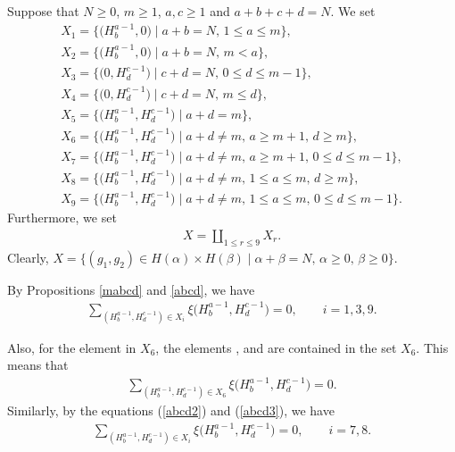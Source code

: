 \documentclass[pdftex]{sigma}
\numberwithin{equation}{section}
\begin{document}
Suppose that $N\geq0$, $m\geq1$, $a,c\geq1$ and $a+b+c+d=N$. We set
\begin{gather*}
X_1=\bigl\{\bigl(H^{a-1}_{b},0\bigr)\mid a+b=N,\, 1\leq a \leq m\bigr\},%
\\
X_2=\bigl\{\bigl(H^{a-1}_{b},0\bigr)\mid a+b=N,\, m<a\bigr\},
\\
X_3=\bigl\{\bigl(0,H^{c-1}_{d}\bigr)\mid c+d=N,\, 0\leq d \leq m-1\bigr\},%
\\
X_4=\bigl\{\bigl(0,H^{c-1}_{d}\bigr)\mid c+d=N,\, m\leq d\bigr\},
\\
X_5=\bigl\{\bigl(H^{a-1}_{b},H^{c-1}_{d}\bigr)\mid a+d=m\bigr\},%
\\
X_6=\bigl\{\bigl(H^{a-1}_{b},H^{c-1}_{d}\bigr)\mid a+d\ne m,\,a\geq m+1,\, d\geq m\bigr\},%
\\
X_7=\bigl\{\bigl(H^{a-1}_{b},H^{c-1}_{d}\bigr)\mid a+d\ne m,\,a\geq m+1,\,0\leq d \leq m-1\bigr\},%
\\
X_8=\bigl\{\bigl(H^{a-1}_{b},H^{c-1}_{d}\bigr)\mid a+d\ne m,\,1\leq a\leq m,\,d\geq m\bigr\},%
\\
X_9=\bigl\{\bigl(H^{a-1}_{b},H^{c-1}_{d}\bigr)\mid a+d\ne m,\,1\leq a\leq m,\,0\leq d \leq m-1\bigr\}.%
\end{gather*}
Furthermore, we set
\begin{gather*}
X=\coprod_{1\leq r\leq 9}X_{r}.%
\end{gather*}
Clearly,
$X=\{(g_1,g_2)\in H(\alpha)\times H(\beta)\mid \alpha+\beta=N,\, \alpha\geq 0,\, \beta \geq 0\}$.%


By Propositions \ref{mabcd} and \ref{abcd}, we have
\begin{gather*}
\sum_{(H^{a-1}_{b},H^{c-1}_{d})\in X_i}\xi\bigl(H^{a-1}_{b},H^{c-1}_{d}\bigr)=0,\qquad i=1,3,9.
\end{gather*}


Also, for the element  in $X_6$, the elements ,  and  are contained in the set $X_6$. This means that
\begin{gather*}
\sum_{(H^{a-1}_{b},H^{c-1}_{d})\in X_6}\xi\bigl(H^{a-1}_{b},H^{c-1}_{d}\bigr)=0.
\end{gather*}
Similarly, by the equations (\ref{abcd2}) and (\ref{abcd3}), we have
\begin{gather*}
\sum_{(H^{a-1}_{b},H^{c-1}_{d})\in X_i}\xi\bigl(H^{a-1}_{b},H^{c-1}_{d}\bigr)=0,\qquad i=7, 8.
\end{gather*}
\end{document}
